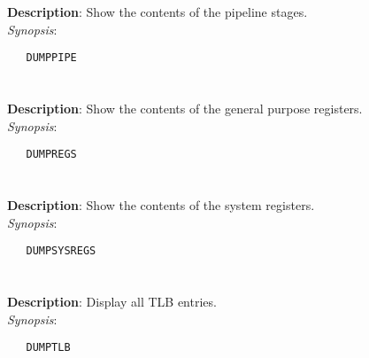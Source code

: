 \section{\quad{}}
\label{manpages:DUMPPIPE}
\label{manpages:dumppipe}
\vspace{-0.1in}
{\bf Description}: 	Show the contents of the pipeline stages.\\[1.5ex]
{\em Synopsis}:
\vspace{-0.05in}
\scriptsize
\begin{lstlisting}
   DUMPPIPE   									
\end{lstlisting}
\normalsize
\vspace{-0.05in}


\section{\quad{}}
\label{manpages:DUMPREGS}
\label{manpages:dumpregs}
\vspace{-0.1in}
{\bf Description}: 	Show the contents of the general purpose registers.\\[1.5ex]
{\em Synopsis}:
\vspace{-0.05in}
\scriptsize
\begin{lstlisting}
   DUMPREGS   							
\end{lstlisting}
\normalsize
\vspace{-0.05in}


\section{\quad{}}
\label{manpages:DUMPSYSREGS}
\label{manpages:dumpsysregs}
\vspace{-0.1in}
{\bf Description}: 	Show the contents of the system registers.\\[1.5ex]
{\em Synopsis}:
\vspace{-0.05in}
\scriptsize
\begin{lstlisting}
   DUMPSYSREGS   									
\end{lstlisting}
\normalsize
\vspace{-0.05in}


\section{\quad{}}
\label{manpages:DUMPTLB}
\label{manpages:dumptlb}
\vspace{-0.1in}
{\bf Description}: 	Display all TLB entries.\\[1.5ex]
{\em Synopsis}:
\vspace{-0.05in}
\scriptsize
\begin{lstlisting}
   DUMPTLB   																						
\end{lstlisting}
\normalsize
\vspace{-0.05in}


